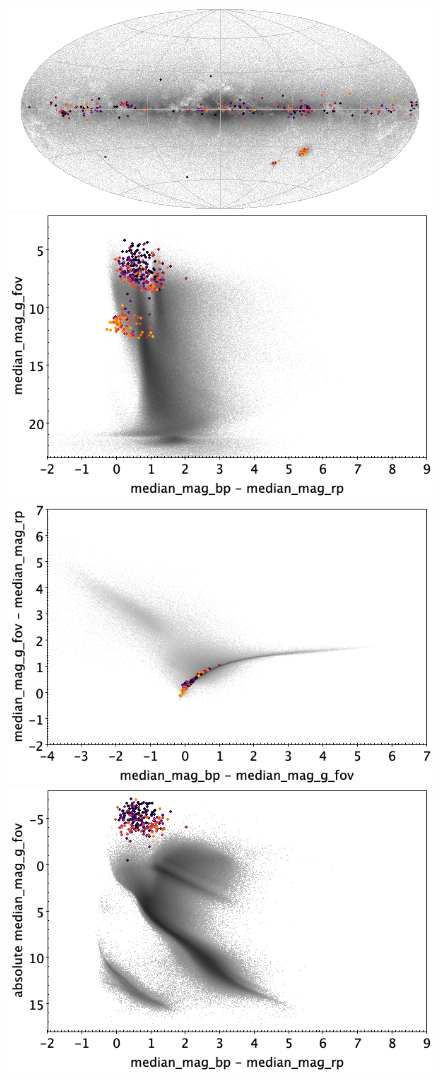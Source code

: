 \documentclass[longauth]{aa}
\begin{document}
\begin{appendix}
\begin{figure}
\centering
{}
\includegraphics[width=0.6\hsize]{figures/appendix/ACYG_cls_sky.png} 
 \\ %
\vspace{4mm}
 \includegraphics[width=0.45\hsize]{figures/appendix/ACYG_cls_cm.png}  %
\hspace{2mm}
 \includegraphics[width=0.45\hsize]{figures/appendix/ACYG_cls_cc.png} \\ %
\vspace{4mm}
 \includegraphics[width=0.45\hsize]{figures/appendix/ACYG_cls_cam.png}  %

\end{figure}
\end{appendix}
\end{document}

